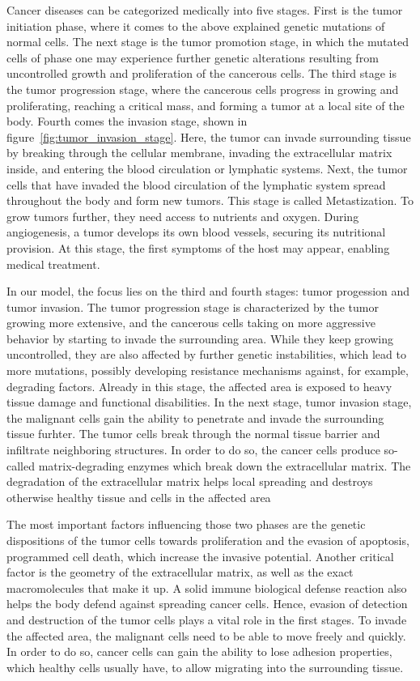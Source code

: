 Cancer diseases can be categorized medically into five stages. First is the tumor initiation phase, where it comes to the above explained genetic mutations of normal cells. The next stage is the tumor promotion stage, in which the mutated cells of phase one may experience further genetic alterations resulting from uncontrolled growth and proliferation of the cancerous cells. The third stage is the tumor progression stage, where the cancerous cells progress in growing and proliferating, reaching a critical mass, and forming a tumor at a local site of the body. Fourth comes the invasion stage, shown in figure~\ref{fig:tumor_invasion_stage}. Here, the tumor can invade surrounding tissue by breaking through the cellular membrane, invading the extracellular matrix inside, and entering the blood circulation or lymphatic systems. Next, the tumor cells that have invaded the blood circulation of the lymphatic system spread throughout the body and form new tumors. This stage is called Metastization. To grow tumors further, they need access to nutrients and oxygen. During angiogenesis, a tumor develops its own blood vessels, securing its nutritional provision. At this stage, the first symptoms of the host may appear, enabling medical treatment.

In our model, the focus lies on the third and fourth stages: tumor progession and tumor invasion. The tumor progression stage is characterized by the tumor growing more extensive, and the cancerous cells taking on more aggressive behavior by starting to invade the surrounding area. While they keep growing uncontrolled, they are also affected by further genetic instabilities, which lead to more mutations, possibly developing resistance mechanisms against, for example, degrading factors. Already in this stage, the affected area is exposed to heavy tissue damage and functional disabilities. In the next stage, tumor invasion stage, the malignant cells gain the ability to penetrate and invade the surrounding tissue furhter. The tumor cells break through the normal tissue barrier and infiltrate neighboring structures. In order to do so, the cancer cells produce so-called matrix-degrading enzymes which break down the extracellular matrix. The degradation of the extracellular matrix helps local spreading and destroys otherwise healthy tissue and cells in the affected area

The most important factors influencing those two phases are the genetic dispositions of the tumor cells towards proliferation and the evasion of apoptosis, programmed cell death, which increase the invasive potential. Another critical factor is the geometry of the extracellular matrix, as well as the exact macromolecules that make it up. A solid immune biological defense reaction also helps the body defend against spreading cancer cells. Hence, evasion of detection and destruction of the tumor cells plays a vital role in the first stages. To invade the affected area, the malignant cells need to be able to move freely and quickly. In order to do so, cancer cells can gain the ability to lose adhesion properties, which healthy cells usually have, to allow migrating into the surrounding tissue.

